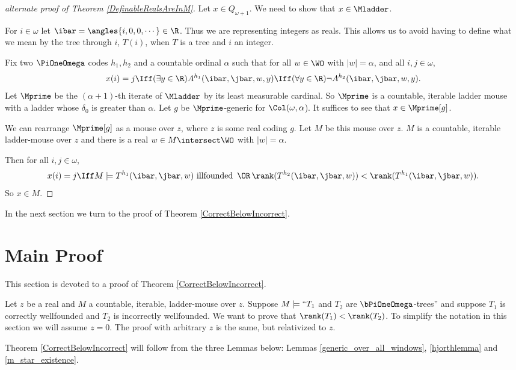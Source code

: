 \documentclass[oneside,12pt]{amsart}
\begin{document}
\begin{proof}[alternate proof of Theorem \ref{DefinableRealsAreInM}]
Let $x\in Q_{\omega+1}$. We need to show that $x\in\Mladder$.

For $i\in\omega$ let $\ibar=\angles{i,0,0,\cdots}\in\R$. Thus we are representing integers as reals.
This allows us to avoid having to define what we mean by the tree through $i$, $T(i)$, when $T$ is a tree and $i$ an integer.


Fix two $\PiOneOmega$ codes $h_1,h_2$ and a countable ordinal $\alpha$ such that for
all $w\in\WO$ with $|w|=\alpha$, and all $i,j\in\omega$,
$$x(i)=j \Iff (\exists y\in\R)A^{h_1}(\ibar,\jbar,w,y) \Iff (\forall y\in\R)\neg A^{h_2}(\ibar,\jbar,w,y).$$
Let $\Mprime$ be the $(\alpha+1)$-th iterate of $\Mladder$ by its least
measurable cardinal. So $\Mprime$ is a countable, iterable ladder mouse with
a ladder whose $\delta_0$ is greater than $\alpha$. Let $g$ be $\Mprime$-generic
for $\Col(\omega,\alpha$). It suffices to see that $x\in\Mprime[g]$.

We can rearrange $\Mprime[g]$ as a mouse over $z$, where $z$ is some real coding $g$.
Let $M$ be this mouse over $z$. $M$ is a countable, iterable ladder-mouse over $z$ and there
is a real $w\in M\intersect\WO$ with $|w|=\alpha$.

Then for all
$i,j\in\omega$,
$$x(i)=j \Iff  M \models T^{h_1}(\ibar,\jbar,w) \text{ illfounded } \,\OR\, \rank(T^{h_2}(\ibar,\jbar,w)) < \rank(T^{h_1}(\ibar,\jbar,w)).$$
So $x\in M$.

\end{proof}

In the next section we turn to the proof of Theorem \ref{CorrectBelowIncorrect}.


\section{Main Proof}
\label{section:mainproof}

This section is devoted to a proof of Theorem \ref{CorrectBelowIncorrect}.

Let $z$ be a real and $M$ a countable, iterable, ladder-mouse over $z$.
Suppose $M\models ``T_1$ and $T_2$ are $\bPiOneOmega$-trees'' and
suppose $T_1$ is correctly wellfounded and
$T_2$ is incorrectly wellfounded. We want to prove that
$\rank(T_1) < \rank(T_2)$. To simplify the notation in this section we will
assume $z=0$. The proof
with arbitrary $z$ is the same, but relativized to $z$.

Theorem \ref{CorrectBelowIncorrect} will follow from the three Lemmas below:
Lemmas \ref{generic_over_all_windows}, \ref{hjorthlemma} and \ref{m_star_existence}.
\end{document}
